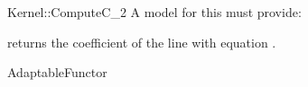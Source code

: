 \begin{ccRefFunctionObjectConcept}{Kernel::ComputeC_2}
A model for this must provide:


       {returns the coefficient  of the line with equation .}

\ccRefines
AdaptableFunctor



\end{ccRefFunctionObjectConcept}
